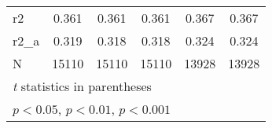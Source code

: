 {\begin{tabular}{l*{5}{c}}
r2          &       0.361         &       0.361         &       0.361         &       0.367         &       0.367         \\
r2\_a        &       0.319         &       0.318         &       0.318         &       0.324         &       0.324         \\
N           &       15110         &       15110         &       15110         &       13928         &       13928         \\
\hline\hline
\multicolumn{6}{l}{\footnotesize \textit{t} statistics in parentheses}\\
\multicolumn{6}{l}{\footnotesize \sym{*} \(p<0.05\), \sym{**} \(p<0.01\), \sym{***} \(p<0.001\)}\\
\end{tabular}
}
